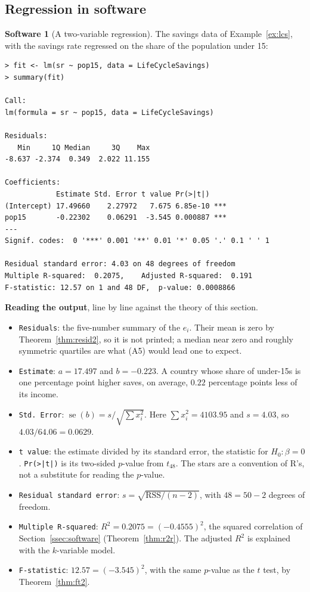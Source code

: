 \documentclass[11pt,a4paper]{article}
\numberwithin{equation}{section}
\theoremstyle{definition}
\newtheorem{software}[thm]{Software}
\begin{document}
\subsection{Regression in software}
\label{ssec:software2}

\begin{software}[A two-variable regression]
\label{sw:lm}
The savings data of Example~\ref{ex:lcs}, with the savings rate regressed on the share of the population under 15:
{\small\begin{verbatim}
> fit <- lm(sr ~ pop15, data = LifeCycleSavings)
> summary(fit)

Call:
lm(formula = sr ~ pop15, data = LifeCycleSavings)

Residuals:
   Min     1Q Median     3Q    Max
-8.637 -2.374  0.349  2.022 11.155

Coefficients:
            Estimate Std. Error t value Pr(>|t|)
(Intercept) 17.49660    2.27972   7.675 6.85e-10 ***
pop15       -0.22302    0.06291  -3.545 0.000887 ***
---
Signif. codes:  0 '***' 0.001 '**' 0.01 '*' 0.05 '.' 0.1 ' ' 1

Residual standard error: 4.03 on 48 degrees of freedom
Multiple R-squared:  0.2075,    Adjusted R-squared:  0.191
F-statistic: 12.57 on 1 and 48 DF,  p-value: 0.0008866
\end{verbatim}}
\textbf{Reading the output}, line by line against the theory of this section.
\begin{itemize}
\item \texttt{Residuals}: the five-number summary of the $e_i$. Their mean is zero by Theorem~\ref{thm:resid2}, so it is not printed; a median
near zero and roughly symmetric quartiles are what (A5) would lead one to expect.
\item \texttt{Estimate}: $a = 17.497$ and $b = -0.223$. A country whose share of under-15s is one percentage point higher saves, on average,
$0.22$ percentage points less of its income.
\item \texttt{Std.\ Error}: $\operatorname{se}(b) = s/\sqrt{\sum x_i^2}$. Here $\sum x_i^2 = 4103.95$ and $s = 4.03$, so
$4.03/64.06 = 0.0629$.
\item \texttt{t value}: the estimate divided by its standard error, the statistic for $H_0\colon\beta = 0$. \texttt{Pr(>|t|)} is its two-sided
$p$-value from $t_{48}$. The stars are a convention of R's, not a substitute for reading the $p$-value.
\item \texttt{Residual standard error}: $s = \sqrt{\text{RSS}/(n-2)}$, with $48 = 50 - 2$ degrees of freedom.
\item \texttt{Multiple R-squared}: $R^2 = 0.2075 = (-0.4555)^2$, the squared correlation of Section~\ref{ssec:software}
(Theorem~\ref{thm:r2r}). The adjusted $R^2$ is explained with the $k$-variable model.
\item \texttt{F-statistic}: $12.57 = (-3.545)^2$, with the same $p$-value as the $t$ test, by Theorem~\ref{thm:ft2}.
\end{itemize}


\end{software}
\end{document}
